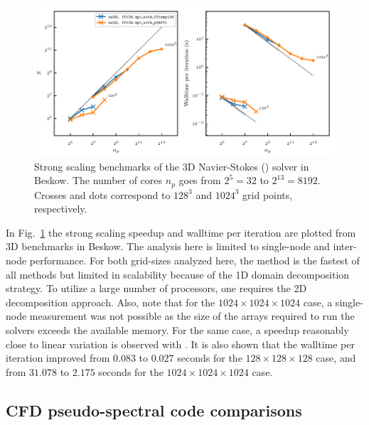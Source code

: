 \documentclass{../jors}
\begin{document}
\begin{figure}[htp]
\centering
\includegraphics[width=\linewidth]{tmp/fig_bench_strong3d}
\caption{Strong scaling benchmarks of the 3D Navier-Stokes
() solver in Beskow. The number of cores $n_p$
goes from $2^5 = 32$ to $2^{13} = 8192$. Crosses and dots correspond to $128^3$
and $1024^3$ grid points, respectively.}
\label{fig:strong3d_beskow}
\end{figure}

In Fig.~\ref{fig:strong3d_beskow} the strong scaling speedup and walltime per
iteration are plotted from 3D benchmarks in Beskow.
%
The analysis here is limited to single-node and inter-node performance.
%
For both grid-sizes analyzed here, the 
method is the fastest of all methods but limited in scalability because of the
1D domain decomposition strategy.  To utilize a large number of processors, one
requires the 2D decomposition approach. Also, note that for the
$1024\times1024\times1024$ case, a single-node measurement was not possible as
the size of the arrays required to run the solvers exceeds the available
memory. For the same case, a speedup reasonably close to linear variation is
observed with .
%
It is also shown that the walltime per iteration improved from
%
$0.083$ to $0.027$ seconds for the $128\times128\times128$ case, and from
$31.078$ to $2.175$ seconds for the $1024\times1024\times1024$ case.



\subsection*{CFD pseudo-spectral code comparisons}

\end{document}
